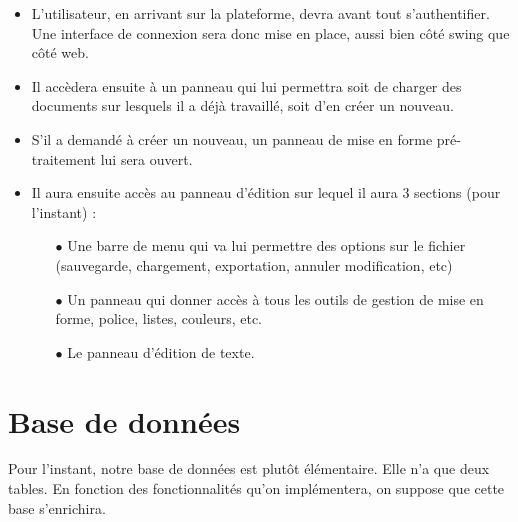 	\begin{itemize}
	
		\item L'utilisateur, en arrivant sur la plateforme, devra avant tout s'authentifier. Une interface de connexion sera donc mise en place, aussi bien côté swing que côté web.
		
		\item Il accèdera ensuite à un panneau qui lui permettra soit de charger des documents sur lesquels il a déjà travaillé, soit d'en créer un nouveau.
		
		\item S'il a demandé à créer un nouveau, un panneau de mise en forme pré-traitement lui sera ouvert.
		
		\item Il aura ensuite accès au panneau d'édition sur lequel il aura 3 sections (pour l'instant) : \par
		
		\begin{itemize}
			
			\item[$\bullet$] Une barre de menu qui va lui permettre des options sur le fichier (sauvegarde, chargement, exportation, annuler modification, etc)
			
			\item[$\bullet$] Un panneau qui donner accès à tous les outils de gestion de mise en forme, police, listes, couleurs, etc.
			
			\item[$\bullet$] Le panneau d'édition de texte.
		
		\end{itemize}
	
	\end{itemize}
	
	\section{Base de données}
	
	Pour l'instant, notre base de données est plutôt élémentaire. Elle n'a que deux tables. En fonction des fonctionnalités qu'on implémentera, on suppose que cette base s'enrichira.
	
